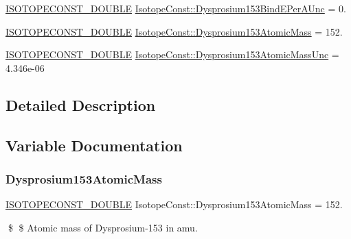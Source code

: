 \begin{DoxyCompactItemize}
\item 
\mbox{\hyperlink{group___isotope_const-_macros_ga8f45a7272ce02c0b4c65c44636ed719a}{I\+S\+O\+T\+O\+P\+E\+C\+O\+N\+S\+T\+\_\+\+D\+O\+U\+B\+LE}} \mbox{\hyperlink{group___isotope_const-_dysprosium-_dy153_ga733e143b21ff21b3966c438ec93a827c}{Isotope\+Const\+::\+Dysprosium153\+Bind\+E\+Per\+A\+Unc}} = 0.
\item 
\mbox{\hyperlink{group___isotope_const-_macros_ga8f45a7272ce02c0b4c65c44636ed719a}{I\+S\+O\+T\+O\+P\+E\+C\+O\+N\+S\+T\+\_\+\+D\+O\+U\+B\+LE}} \mbox{\hyperlink{group___isotope_const-_dysprosium-_dy153_gae623f57823e0e814e1aa7d13b757431b}{Isotope\+Const\+::\+Dysprosium153\+Atomic\+Mass}} = 152.
\item 
\mbox{\hyperlink{group___isotope_const-_macros_ga8f45a7272ce02c0b4c65c44636ed719a}{I\+S\+O\+T\+O\+P\+E\+C\+O\+N\+S\+T\+\_\+\+D\+O\+U\+B\+LE}} \mbox{\hyperlink{group___isotope_const-_dysprosium-_dy153_gaf8ca121b90cf2e21e9e035516fd1b36b}{Isotope\+Const\+::\+Dysprosium153\+Atomic\+Mass\+Unc}} = 4.\+346e-\/06
\end{DoxyCompactItemize}


\subsection{Detailed Description}


\subsection{Variable Documentation}
\mbox{\label{group___isotope_const-_dysprosium-_dy153_gae623f57823e0e814e1aa7d13b757431b}} 
\subsubsection{\texorpdfstring{Dysprosium153\+Atomic\+Mass}{Dysprosium153AtomicMass}}
{\footnotesize\ttfamily \mbox{\hyperlink{group___isotope_const-_macros_ga8f45a7272ce02c0b4c65c44636ed719a}{I\+S\+O\+T\+O\+P\+E\+C\+O\+N\+S\+T\+\_\+\+D\+O\+U\+B\+LE}} Isotope\+Const\+::\+Dysprosium153\+Atomic\+Mass = 152.}

\$ \$ Atomic mass of Dysprosium-\/153 in amu. \mbox{\label{group___isotope_const-_dysprosium-_dy153_gaf8ca121b90cf2e21e9e035516fd1b36b}} 
